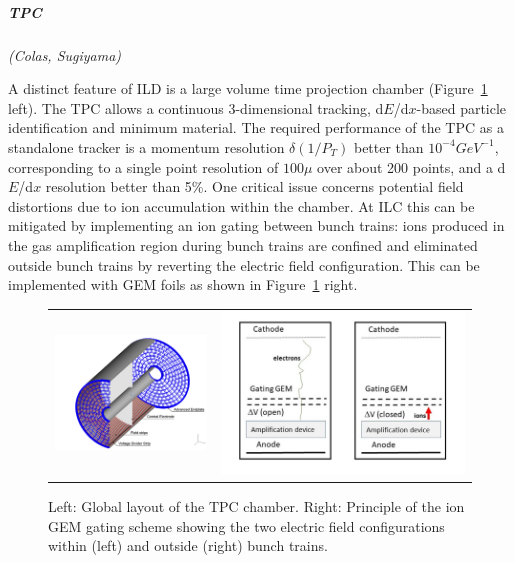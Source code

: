 \vspace{1cm}
\subparagraph*{\bf TPC}
\textit{(Colas, Sugiyama)}

A distinct feature of ILD is a large volume time projection chamber (Figure~\ref{fig:det:TPC} left). The TPC allows a continuous 3-dimensional tracking, d$E$/d$x$-based particle identification and minimum material. The required performance of the TPC as a standalone tracker is a momentum resolution $\delta(1/P_T)$ better than $10^{-4} GeV^{-1}$, corresponding to a single point resolution of $100\mu$ over about 200 points, and a d$E$/d$x$ resolution better than 5\%. One critical issue concerns potential field distortions due to ion accumulation within the chamber. At ILC this can be mitigated by implementing an ion gating between bunch trains: ions produced in the gas amplification region during bunch trains are confined and eliminated outside bunch trains by reverting the electric field configuration. This can be implemented with GEM foils as shown in Figure~\ref{fig:det:TPC} right.

\begin{figure}[t!]
\begin{tabular}{cc}
\includegraphics[width=0.6\hsize,viewport={0 -10 600 500},clip]{Detector/fig/TPC.png} &
\includegraphics[width=0.5\hsize]{Detector/fig/gate.jpg}
\end{tabular}
\caption[TPC layout]{Left: Global layout of the TPC chamber. Right: Principle of the ion GEM gating scheme showing the two electric field configurations within (left) and outside (right) bunch trains.}
\label{fig:det:TPC}
\end{figure}


